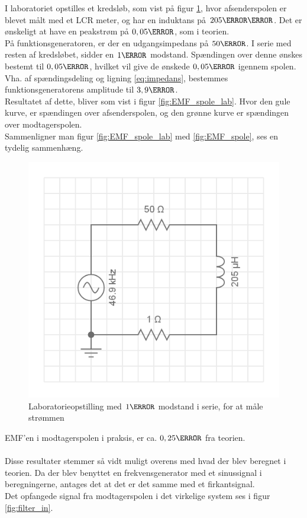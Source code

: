 I laboratoriet opstilles et kredsløb, som vist på figur \ref{fig:kredslob_spole}, hvor afsenderspolen er blevet målt med et LCR meter, og har en induktans på $205\micro\henry$.
Det er ønskeligt at have en peakstrøm på $0,05 \ampere$, som i teorien.\\
På funktionsgeneratoren, er der en udgangsimpedans på $50\ohm$.
I serie med resten af kredsløbet, sidder en $1\ohm$ modstand. Spændingen over denne ønskes bestemt til $0,05\volt$, hvilket vil give de ønskede $0,05\ampere$ igennem spolen.
Vha. af spændingsdeling og ligning \ref{eq:impedans}, bestemmes funktionsgeneratorens amplitude til $3,9\volt$.\\
Resultatet af dette, bliver som vist i figur \ref{fig:EMF_spole_lab}.
Hvor den gule kurve, er spændingen over afsenderspolen, og den grønne kurve er spændingen over modtagerspolen.\\
Sammenligner man figur \ref{fig:EMF_spole_lab} med \ref{fig:EMF_spole}, ses en tydelig sammenhæng.\\
\begin{figure}
	\centering
	\includegraphics[width=.5\textwidth]{billeder/circuit_spole.png}
	\caption{Laboratorieopstilling med $1\ohm$ modstand i serie, for at måle strømmen}
	\label{fig:kredslob_spole}
\end{figure}
EMF'en i modtagerspolen i praksis, er ca. $0,25\volt$ fra teorien.\\ \\
Disse resultater stemmer så vidt muligt overens med hvad der blev beregnet i teorien. Da der blev benyttet en frekvensgenerator med et sinussignal i beregningerne, antages det at det er det samme med et firkantsignal. \\
Det opfangede signal fra modtagerspolen i det virkelige system ses i figur \ref{fig:filter_in}.

